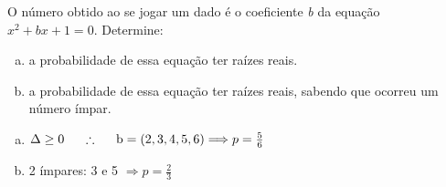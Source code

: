 \begin{ex}
 O número obtido ao se jogar um dado é o coeficiente
\textit{b} da equação  $ x^2 + bx + 1 = 0 $. Determine:
   \begin{enumerate}[(a)]
   \item a probabilidade de essa equação ter raízes reais.
   \item a probabilidade de essa equação ter raízes reais, sabendo que ocorreu um número ímpar.
   \end{enumerate}
     \begin{sol}
      \phantom{A} 
       \begin{enumerate} [(a)]
           \item $\Delta \geq 0 \hspace{0,5cm}\therefore\hspace{0,5cm}  \text{b}=(2, 3, 4, 5, 6) \Longrightarrow p=\frac{5}{6}$
           \item 2 ímpares: 3 e 5 $\Longrightarrow p=\frac{2}{3}$ 
       \end{enumerate}
     \end{sol}
\end{ex}